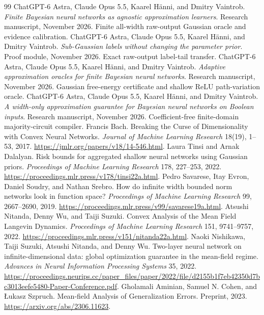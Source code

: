 \documentclass[11pt]{article}
\theoremstyle{remark}\newtheorem{remark}[theorem]{Remark}
\begin{document}
\begin{thebibliography}{99}
 ChatGPT-6 Astra, Claude Opus 5.5, Kaarel H\"anni, and
Dmitry Vaintrob. \emph{Finite Bayesian neural networks as agnostic
approximation learners}. Research manuscript, November 2026. Finite
all-width raw-output Gaussian oracle and evidence calibration.
 ChatGPT-6 Astra, Claude Opus 5.5, Kaarel H\"anni, and
Dmitry Vaintrob. \emph{Sub-Gaussian labels without changing the parameter
prior}. Proof module, November 2026. Exact raw-output label-tail transfer.
 ChatGPT-6 Astra, Claude Opus 5.5, Kaarel H\"anni,
and Dmitry Vaintrob. \emph{Adaptive approximation oracles for finite
Bayesian neural networks}. Research manuscript, November 2026.
Gaussian free-energy certificate and shallow ReLU path-variation oracle.
 ChatGPT-6 Astra, Claude Opus 5.5, Kaarel H\"anni, and
Dmitry Vaintrob. \emph{A width-only approximation guarantee for Bayesian
neural networks on Boolean inputs}. Research manuscript, November 2026.
Coefficient-free finite-domain majority-circuit compiler.
 Francis Bach. Breaking the Curse of Dimensionality with Convex Neural Networks. \emph{Journal of Machine Learning Research} 18(19), 1--53, 2017. \url{https://jmlr.org/papers/v18/14-546.html}.
 Laura Tinsi and Arnak Dalalyan. Risk bounds for aggregated shallow neural networks using Gaussian priors. \emph{Proceedings of Machine Learning Research} 178, 227--253, 2022. \url{https://proceedings.mlr.press/v178/tinsi22a.html}.
 Pedro Savarese, Itay Evron, Daniel Soudry, and Nathan Srebro. How do infinite width bounded norm networks look in function space? \emph{Proceedings of Machine Learning Research} 99, 2667--2690, 2019. \url{https://proceedings.mlr.press/v99/savarese19a.html}.
 Atsushi Nitanda, Denny Wu, and Taiji Suzuki. Convex Analysis of the Mean Field Langevin Dynamics. \emph{Proceedings of Machine Learning Research} 151, 9741--9757, 2022. \url{https://proceedings.mlr.press/v151/nitanda22a.html}.
 Naoki Nishikawa, Taiji Suzuki, Atsushi Nitanda, and Denny Wu. Two-layer neural network on infinite-dimensional data: global optimization guarantee in the mean-field regime. \emph{Advances in Neural Information Processing Systems} 35, 2022. \url{https://proceedings.neurips.cc/paper_files/paper/2022/file/d2155b1f7eb42350d7bc3013eefe5480-Paper-Conference.pdf}.
 Gholamali Aminian, Samuel N. Cohen, and {\L}ukasz Szpruch. Mean-field Analysis of Generalization Errors. Preprint, 2023. \url{https://arxiv.org/abs/2306.11623}.

\end{thebibliography}
\end{document}
